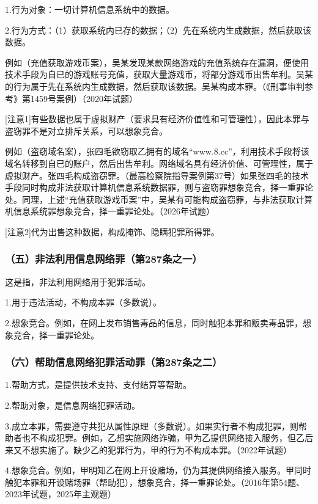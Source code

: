 1.行为对象：一切计算机信息系统中的数据。

2.行为方式：（1）获取系统内已存的数据；（2）先在系统内生成数据，然后获取该数据。

例如（充值获取游戏币案），吴某发现某款网络游戏的充值系统存在漏洞，便使用技术手段为自已的游戏账号充值，获取大量游戏币，将部分游戏币出售牟利。吴某的行为属于先在系统内生成数据，然后获取该数据。吴某构成本罪。（《刑事审判参考》第1459号案例）（2020年试题）

[注意1]有些数据也属于虚拟财产（要求具有经济价值性和可管理性），因此本罪与盗窃罪不是对立排斥关系，可以想象竞合。

例如（盗窃域名案），张四毛欲窃取乙拥有的域名“www.8.cc”，利用技术手段将该域名转移到自已的账户，然后出售牟利。网络域名具有经济价值、可管理性，属于虚拟财产。张四毛构成盗窃罪。（最高检察院指导案例第37号）如果张四毛的技术手段同时构成非法获取计算机信息系统数据罪，则与盗窃罪想象竞合，择一重罪论处。同理，上述“充值获取游戏币案”中，吴某有可能构成盗窃罪，与非法获取计算机信息系统罪想象竞合，择一重罪论处。（2026年试题）

[注意2]代为出售这种数据，构成掩饰、隐瞒犯罪所得罪。

\subsubsection*{（五）非法利用信息网络罪（第287条之一）}

这是指，非法利用网络用于犯罪活动。

1.用于违法活动，不构成本罪（多数说）。

2.想象竞合。例如，在网上发布销售毒品的信息，同时触犯本罪和贩卖毒品罪，想象竞合，择一重罪论处。

\subsubsection*{（六）帮助信息网络犯罪活动罪（第287条之二）}

1.帮助方式，是提供技术支持、支付结算等帮助。

2.帮助对象，是信息网络犯罪活动。

3.成立本罪，需要遵守共犯从属性原理（多数说）。如果实行者不构成犯罪，则帮助者也不构成犯罪。例如，乙想实施网络诈骗，甲为乙提供网络接入服务，但乙后来又不想实施了。缺少乙的犯罪行为，甲的行为不构成本罪。（2022年试题）

4.想象竞合。例如，甲明知乙在网上开设赌场，仍为其提供网络接入服务。甲同时触犯本罪和开设赌场罪（帮助犯），想象竞合，择一重罪论处。（2016年第54题、2023年试题，2025年主观题）

